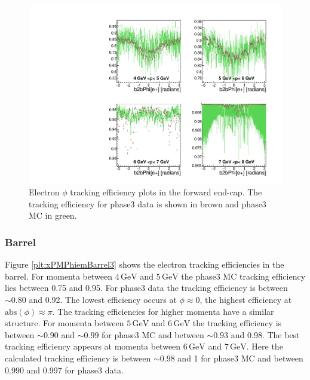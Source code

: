 \documentclass[a4paper,11pt,twosided,final,german,openbib,pdftex,listof=totoc,bibliography=totoc]{scrbook}
\begin{document}
\begin{figure}[!htbp]
	\centering
	\includegraphics[width=\textwidth]{Plots/master3/xPMPhiemFCP3}
	\caption[Momentum $\phi$ Electron Forward End-Cap Efficiency Phase3]{Electron $\phi$ tracking efficiency plots in the forward end-cap. The tracking efficiency for phase3 data is shown in brown and phase3 MC in green.}
	\label{plt:xPMPhiemFC3}
\end{figure}



\newpage
\subsubsection{Barrel}

Figure \ref{plt:xPMPhiemBarrel3} shows the electron tracking efficiencies in the barrel.
For momenta between $4\,\textrm{GeV}$ and $5\,\textrm{GeV}$ the phase3 MC tracking efficiency lies between 0.75 and 0.95. For phase3 data the tracking efficiency is between $ \sim 0.80$ and 0.92. The lowest efficiency occurs at $\phi \approx 0$, the highest efficiency at $\textrm{abs}(\phi) \approx \pi$.
The tracking efficiencies for higher momenta have a similar structure. 
For momenta between $5\,\textrm{GeV}$ and $6\,\textrm{GeV}$ the tracking efficiency is between $\sim 0.90$ and $\sim 0.99$ for phase3 MC and between $\sim 0.93$ and 0.98. The best tracking efficiency appears at momenta between $6\,\textrm{GeV}$ and $7\,\textrm{GeV}$. Here the calculated tracking efficiency is between $\sim 0.98$ and 1 for phase3 MC and between 0.990 and 0.997 for phase3 data.
\end{document}
